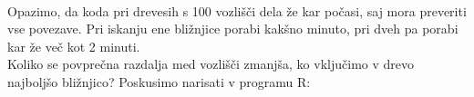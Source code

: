 \documentclass[a4paper,10pt]{article}
\begin{document}
\\[0.5cm]
Opazimo, da koda pri drevesih s 100 vozlišči dela že kar počasi, saj mora preveriti vse povezave. Pri iskanju ene bližnjice porabi kakšno minuto, pri dveh pa porabi kar že več kot 2 minuti.
\\[0.5cm]
 Koliko se povprečna razdalja med vozlišči zmanjša, ko vključimo v drevo najboljšo bližnjico?
\newline
Poskusimo narisati v programu R:
\end{document}
